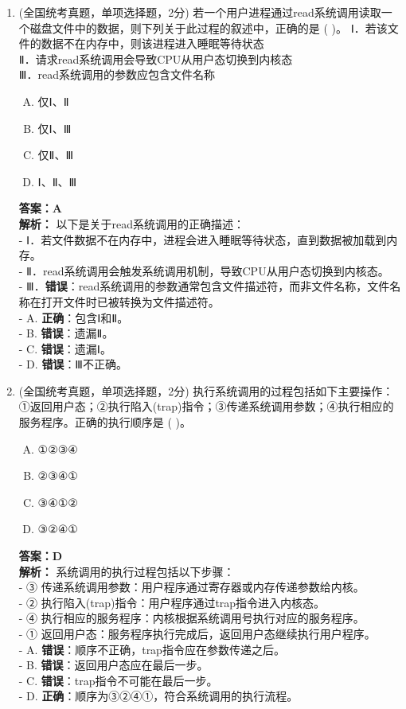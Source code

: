 \documentclass[lang=cn,newtx,10pt,scheme=chinese]{../../elegantbook}
\begin{document}
\begin{enumerate}
    \item (全国统考真题，单项选择题，2分) 若一个用户进程通过read系统调用读取一个磁盘文件中的数据，则下列关于此过程的叙述中，正确的是 (    )。
    Ⅰ．若该文件的数据不在内存中，则该进程进入睡眠等待状态\\
    Ⅱ．请求read系统调用会导致CPU从用户态切换到内核态\\
    Ⅲ．read系统调用的参数应包含文件名称\\
    \begin{enumerate}[A.]
        \item 仅Ⅰ、Ⅱ
        \item 仅Ⅰ、Ⅲ
        \item 仅Ⅱ、Ⅲ
        \item Ⅰ、Ⅱ、Ⅲ
    \end{enumerate}
    \textbf{答案：A}\\
    \textbf{解析：} 以下是关于read系统调用的正确描述：\\
    - Ⅰ．若文件数据不在内存中，进程会进入睡眠等待状态，直到数据被加载到内存。\\
    - Ⅱ．read系统调用会触发系统调用机制，导致CPU从用户态切换到内核态。\\
    - Ⅲ．\textbf{错误}：read系统调用的参数通常包含文件描述符，而非文件名称，文件名称在打开文件时已被转换为文件描述符。\\
    - A. \textbf{正确}：包含Ⅰ和Ⅱ。\\
    - B. \textbf{错误}：遗漏Ⅱ。\\
    - C. \textbf{错误}：遗漏Ⅰ。\\
    - D. \textbf{错误}：Ⅲ不正确。\\
    \item (全国统考真题，单项选择题，2分) 执行系统调用的过程包括如下主要操作：①返回用户态；②执行陷入(trap)指令；③传递系统调用参数；④执行相应的服务程序。正确的执行顺序是 (    )。
    \begin{enumerate}[A.]
        \item ①②③④
        \item ②③④①
        \item ③④①②
        \item ③②④①
    \end{enumerate}
    \textbf{答案：D}\\
    \textbf{解析：} 系统调用的执行过程包括以下步骤：\\
    - ③ 传递系统调用参数：用户程序通过寄存器或内存传递参数给内核。\\
    - ② 执行陷入(trap)指令：用户程序通过trap指令进入内核态。\\
    - ④ 执行相应的服务程序：内核根据系统调用号执行对应的服务程序。\\
    - ① 返回用户态：服务程序执行完成后，返回用户态继续执行用户程序。\\
    - A. \textbf{错误}：顺序不正确，trap指令应在参数传递之后。\\
    - B. \textbf{错误}：返回用户态应在最后一步。\\
    - C. \textbf{错误}：trap指令不可能在最后一步。\\
    - D. \textbf{正确}：顺序为③②④①，符合系统调用的执行流程。\\


\end{enumerate}
\end{document}

